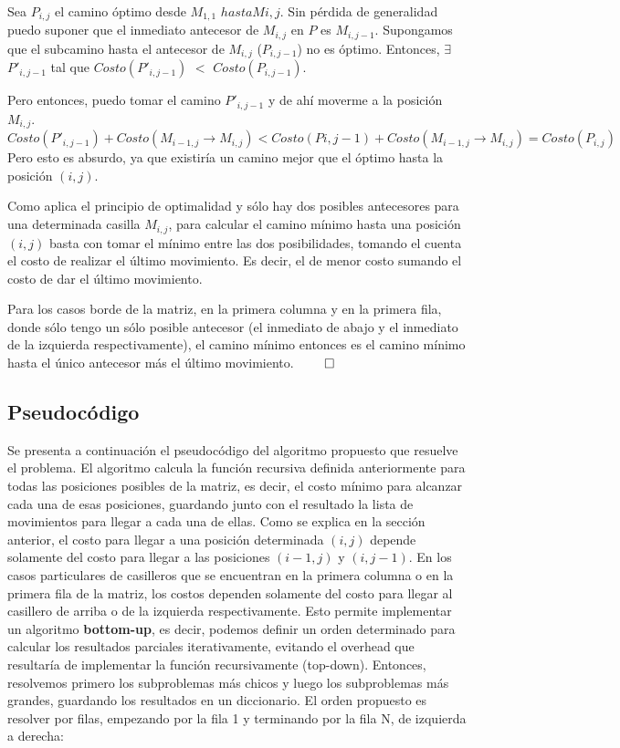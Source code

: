 Sea $P_{i,j}$ el camino óptimo desde $M_{1,1}$ $hasta M{i,j}$.
Sin p\'erdida de generalidad puedo suponer que el inmediato antecesor de $M_{i,j}$ en $P$ es $M_{i, j-1}$. Supongamos que el subcamino hasta el antecesor de $M_{i,j}$ ($P_{i,j-1}$)  no es óptimo. Entonces, $\exists$ $P\prime_{i,j-1}$ tal que $Costo(P\prime_{i,j-1})$ $<$ $Costo(P_{i,j-1})$.

Pero entonces, puedo tomar el camino  $P\prime_{i,j-1}$ y de ahí moverme a la posición $M_{i,j}$. 
$Costo (P\prime_{i,j-1}) + Costo(M_{i-1,j} \rightarrow M_{i,j}) < Costo (P{i,j-1}) + Costo(M_{i-1,j} \rightarrow M_{i,j}) = Costo(P_{i,j})$
Pero esto es absurdo, ya que existiría un camino mejor que el óptimo hasta la posición $(i,j)$.

Como aplica el principio de optimalidad y sólo hay dos posibles antecesores para una determinada casilla $M_{i,j}$, para calcular el camino mínimo hasta una posición $(i,j)$ basta con tomar el mínimo entre las dos posibilidades, tomando el cuenta el costo de realizar el último movimiento. Es decir, el de menor costo sumando el costo de dar el último movimiento.

Para los casos borde de la matriz, en la primera columna y en la primera fila, donde sólo tengo un sólo posible antecesor (el inmediato de abajo y el inmediato de la izquierda respectivamente), el camino mínimo entonces es el camino mínimo hasta el único antecesor más el último movimiento. $\qed$

\subsection{Pseudocódigo}

Se presenta a continuación el pseudocódigo del algoritmo propuesto que resuelve el problema. El algoritmo calcula la función recursiva definida anteriormente para todas las posiciones posibles de la matriz, es decir, el costo mínimo para alcanzar cada una de esas posiciones, guardando junto con el resultado la lista de movimientos para llegar a  cada una de ellas. 
Como se explica en la sección anterior, el costo para llegar a una posición determinada $(i,j)$ depende solamente del costo para llegar a las posiciones $(i-1, j)$ y $(i,j-1)$. En los casos particulares de casilleros que se encuentran en la primera columna o en la primera fila de la matriz, los costos dependen solamente del costo para llegar al casillero de arriba o de la izquierda respectivamente. Esto permite implementar un algoritmo \textbf{bottom-up}, es decir, podemos definir un orden determinado para calcular los resultados parciales iterativamente, evitando el overhead que resultaría de implementar la función recursivamente (top-down). Entonces, resolvemos primero los subproblemas más chicos y luego los subproblemas más grandes, guardando los resultados en un diccionario. El orden propuesto es resolver por filas, empezando por la fila 1 y terminando por la fila N, de izquierda a derecha:

